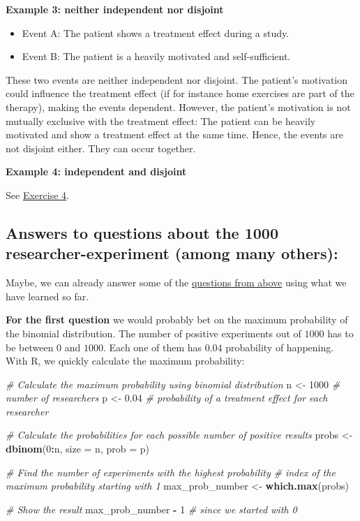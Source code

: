 \documentclass[
]{book}
\newenvironment{Shaded}{\begin{snugshade}}{\end{snugshade}}
\newcommand{\AttributeTok}[1]{\textcolor[rgb]{0.13,0.29,0.53}{#1}}
\newcommand{\CommentTok}[1]{\textcolor[rgb]{0.56,0.35,0.01}{\textit{#1}}}
\newcommand{\DecValTok}[1]{\textcolor[rgb]{0.00,0.00,0.81}{#1}}
\newcommand{\FloatTok}[1]{\textcolor[rgb]{0.00,0.00,0.81}{#1}}
\newcommand{\FunctionTok}[1]{\textcolor[rgb]{0.13,0.29,0.53}{\textbf{#1}}}
\newcommand{\NormalTok}[1]{#1}
\newcommand{\OtherTok}[1]{\textcolor[rgb]{0.56,0.35,0.01}{#1}}
\newcommand{\SpecialCharTok}[1]{\textcolor[rgb]{0.81,0.36,0.00}{\textbf{#1}}}
\providecommand{\tightlist}{%
  \setlength{\itemsep}{0pt}\setlength{\parskip}{0pt}}
\begin{document}
\textbf{Example 3: neither independent nor disjoint}

\begin{itemize}
\tightlist
\item
  Event A: The patient shows a treatment effect during a study.
\item
  Event B: The patient is a heavily motivated and self-sufficient.
\end{itemize}

These two events are neither independent nor disjoint. The patient's motivation could influence the treatment effect (if for instance home exercises
are part of the therapy), making the events dependent.
However, the patient's motivation is not mutually exclusive with the treatment effect: The patient can be heavily motivated and show a
treatment effect at the same time.
Hence, the events are not disjoint either. They can occur together.

\textbf{Example 4: independent and disjoint}

See \hyperref[exercise4]{Exercise 4}.

\subsection{Answers to questions about the 1000 researcher-experiment (among many others):}\label{Answers_Questions_about_the_1000-researcher_experiment}

Maybe, we can already answer some of the \hyperref[Questions_about_the_1000-researcher_experiment]{questions from above} using what we have learned so far.

\textbf{For the first question} we would probably bet on the maximum probability of the binomial distribution. The number of positive experiments out of \(1000\) has to be between \(0\) and \(1000\).
Each one of them has \(0.04\) probability of happening. With R, we quickly calculate the maximum probability:

\begin{Shaded}
\begin{Highlighting}[]
\CommentTok{\# Calculate the maximum probability using binomial distribution}
\NormalTok{n }\OtherTok{\textless{}{-}} \DecValTok{1000}  \CommentTok{\# number of researchers}
\NormalTok{p }\OtherTok{\textless{}{-}} \FloatTok{0.04}  \CommentTok{\# probability of a treatment effect for each researcher}

\CommentTok{\# Calculate the probabilities for each possible number of positive results}
\NormalTok{probs }\OtherTok{\textless{}{-}} \FunctionTok{dbinom}\NormalTok{(}\DecValTok{0}\SpecialCharTok{:}\NormalTok{n, }\AttributeTok{size =}\NormalTok{ n, }\AttributeTok{prob =}\NormalTok{ p)}

\CommentTok{\# Find the number of experiments with the highest probability}
\CommentTok{\# index of the maximum probability starting with 1}
\NormalTok{max\_prob\_number }\OtherTok{\textless{}{-}} \FunctionTok{which.max}\NormalTok{(probs)}

\CommentTok{\# Show the result}
\NormalTok{max\_prob\_number }\SpecialCharTok{{-}} \DecValTok{1} \CommentTok{\# since we started with 0}
\end{Highlighting}
\end{Shaded}
\end{document}
